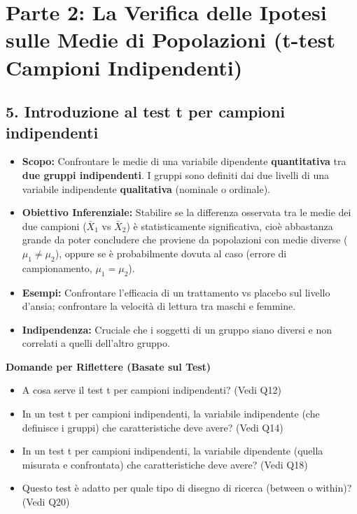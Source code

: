 \documentclass[12pt, a4paper]{article}
\newenvironment{reflectionbox}{%
    \medskip
    \begin{framed}\par\noindent
    \textbf{\color{boxtitlecolor}Domande per Riflettere (Basate sul Test)} \par
    \begin{itemize}[leftmargin=*, label=$\blacktriangleright$]
}{%
    \end{itemize}\par
    \end{framed}
    \medskip
}
\newcommand{\popmean}{\mu}
\newcommand{\samplemean}{\bar{X}}
\begin{document}
\clearpage %

\section*{Parte 2: La Verifica delle Ipotesi sulle Medie di Popolazioni (t-test Campioni Indipendenti)}

\subsection*{5. Introduzione al test t per campioni indipendenti}
\begin{itemize}
    \item \textbf{Scopo:} Confrontare le medie di una variabile dipendente \textbf{quantitativa} tra \textbf{due gruppi indipendenti}. I gruppi sono definiti dai due livelli di una variabile indipendente \textbf{qualitativa} (nominale o ordinale).
    \item \textbf{Obiettivo Inferenziale:} Stabilire se la differenza osservata tra le medie dei due campioni ($\samplemean_1$ vs $\samplemean_2$) è statisticamente significativa, cioè abbastanza grande da poter concludere che proviene da popolazioni con medie diverse ($\popmean_1 \neq \popmean_2$), oppure se è probabilmente dovuta al caso (errore di campionamento, $\popmean_1 = \popmean_2$).
    \item \textbf{Esempi:} Confrontare l'efficacia di un trattamento vs placebo sul livello d'ansia; confrontare la velocità di lettura tra maschi e femmine.
    \item \textbf{Indipendenza:} Cruciale che i soggetti di un gruppo siano diversi e non correlati a quelli dell'altro gruppo.
\end{itemize}

\begin{reflectionbox}
    \item A cosa serve il test t per campioni indipendenti? (Vedi Q12)
    \item In un test t per campioni indipendenti, la variabile indipendente (che definisce i gruppi) che caratteristiche deve avere? (Vedi Q14)
    \item In un test t per campioni indipendenti, la variabile dipendente (quella misurata e confrontata) che caratteristiche deve avere? (Vedi Q18)
    \item Questo test è adatto per quale tipo di disegno di ricerca (between o within)? (Vedi Q20)
\end{reflectionbox}
\end{document}
